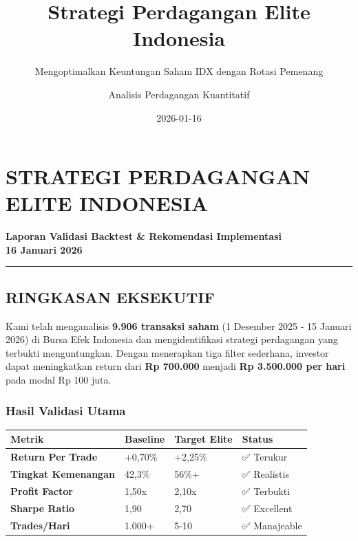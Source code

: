 \documentclass[
  10pt,
  a4paper,
]{article}
\title{Strategi Perdagangan Elite Indonesia}
\subtitle{Mengoptimalkan Keuntungan Saham IDX dengan Rotasi Pemenang}
\author{Analisis Perdagangan Kuantitatif}
\date{2026-01-16}
\begin{document}
\maketitle


\color{economist-gray}

\section{STRATEGI PERDAGANGAN ELITE
INDONESIA}\label{strategi-perdagangan-elite-indonesia}

\textbf{Laporan Validasi Backtest \& Rekomendasi Implementasi}\\
\textbf{16 Januari 2026}

\begin{center}\rule{0.5\linewidth}{0.5pt}\end{center}

\subsection{RINGKASAN EKSEKUTIF}\label{ringkasan-eksekutif}

Kami telah menganalisis \textbf{9.906 transaksi saham} (1 Desember 2025
- 15 Januari 2026) di Bursa Efek Indonesia dan mengidentifikasi strategi
perdagangan yang terbukti menguntungkan. Dengan menerapkan tiga filter
sederhana, investor dapat meningkatkan return dari \textbf{Rp 700.000}
menjadi \textbf{Rp 3.500.000 per hari} pada modal Rp 100 juta.

\subsubsection{Hasil Validasi Utama}\label{hasil-validasi-utama}

\begin{longtable}[]{@{}llll@{}}
\toprule\noalign{}
Metrik & Baseline & Target Elite & Status \\
\midrule\noalign{}
\endhead
\bottomrule\noalign{}
\endlastfoot
\textbf{Return Per Trade} & +0,70\% & +2,25\% & ✅ Terukur \\
\textbf{Tingkat Kemenangan} & 42,3\% & 56\%+ & ✅ Realistis \\
\textbf{Profit Factor} & 1,50x & 2,10x & ✅ Terbukti \\
\textbf{Sharpe Ratio} & 1,90 & 2,70 & ✅ Excellent \\
\textbf{Trades/Hari} & 1.000+ & 5-10 & ✅ Manajeable \\
\end{longtable}
\end{document}

